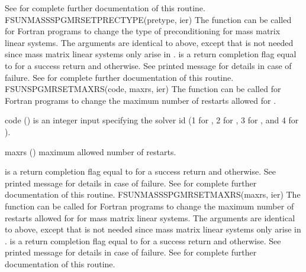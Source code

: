 {
  See  for complete further documentation of
  this routine. 
}
{
  FSUNMASSSPGMRSETPRECTYPE(pretype, ier)
}
{
  The function  can be called for Fortran
  programs to change the type of preconditioning for mass matrix
  linear systems. 
}
{
  The arguments are identical to  above, except that
   is not needed since mass matrix linear systems only arise
  in {\arkode}.
}
{
   is a  return completion flag equal to  for a success
  return and  otherwise. See printed message for details in case
  of failure.
}
{
  See  for complete further documentation of
  this routine. 
}
{
  FSUNSPGMRSETMAXRS(code, maxrs, ier)
}
{
  The function  can be called for Fortran programs
  to change the maximum number of restarts allowed for {\spgmr}.
}
{
  \begin{args}[maxrs]
  \item[code] ()
    is an integer input specifying the solver id (1 for {\cvode}, 2
    for {\ida}, 3 for {\kinsol}, and 4 for {\arkode}).
  \item[maxrs] ()
    maximum allowed number of restarts.
  \end{args}
}
{
   is a  return completion flag equal to  for a success
  return and  otherwise. See printed message for details in case
  of failure.
}
{
  See  for complete further
  documentation of this routine. 
}
{
  FSUNMASSSPGMRSETMAXRS(maxrs, ier)
}
{
  The function  can be called for Fortran
  programs to change the maximum number of restarts allowed for
  {\spgmr} for mass matrix linear systems. 
}
{
  The arguments are identical to  above, except that
   is not needed since mass matrix linear systems only arise
  in {\arkode}.
}
{
   is a  return completion flag equal to  for a success
  return and  otherwise. See printed message for details in case
  of failure.
}
{
  See  for complete further
  documentation of this routine. 
}


